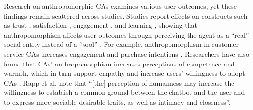 \documentclass[lettersize,journal]{IEEEtran}
\begin{document}



Research on anthropomorphic CAs examines various user outcomes, yet these findings remain scattered across studies. Studies report effects on constructs such as trust \cite{nordheim2019trust}, satisfaction \cite{haugeland_understanding_2022}, engagement \cite{mehra_chatbot_2021}, and learning \cite{zheldibayeva_genai_2025}, showing that %
anthropomorphism affects user outcomes %
through perceiving the agent as a ``real'' social entity instead of a ``tool'' \cite{meyer2023leverage,wang2021seeing}. For example, anthropomorphism in customer service CAs increases engagement and purchase intentions \cite{depaula2025anthropomorphism,luo2019frontiers}. Researchers have also found that CAs' anthropomorphism increases perceptions of competence and warmth, which in turn support empathy and increase users' willingness to adopt CAs \cite{kim_what_2024}. Rapp et al. \cite{rapp_human_2021} note that ``[the] perception of humanness may increase the willingness to establish a common ground between the chatbot and the user and to express more sociable desirable traits, as well as intimacy and closeness''.
\end{document}
